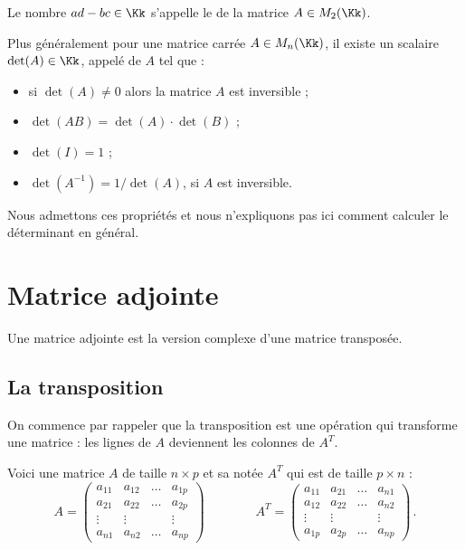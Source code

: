 \documentclass[11pt,class=report,crop=false]{standalone}
\begin{document}
Le nombre $ad-bc \in \Kk$ s'appelle le  de la matrice $A \in M_2(\Kk)$.

Plus généralement pour une matrice carrée $A \in M_n(\Kk)$, il existe
un scalaire $\det(A) \in \Kk$, appelé  de $A$ tel que :
\begin{itemize}
  \item si $\det(A)\neq0$ alors la matrice $A$ est inversible ;
  \item $\det(AB) = \det(A) \cdot \det(B)$ ;
  \item $\det(I) = 1$ ;
  \item $\det(A^{-1}) = 1/\det(A)$, si $A$ est inversible.
\end{itemize}

Nous admettons ces propriétés et nous n'expliquons pas ici comment calculer le déterminant en général.


\section{Matrice adjointe}

Une matrice adjointe est la version complexe d'une matrice transposée.

\subsection{La transposition}

On commence par rappeler que la transposition est une opération qui transforme une matrice : les lignes de $A$ deviennent les colonnes de $A^T$.

Voici une matrice $A$ de taille $n\times p$ et sa  notée $A^T$ qui est de taille $p \times n$ :
$$
A = \left(
\begin{array}{cccc}
a_{11} & a_{12} & \dots & a_{1p}\\
a_{21} & a_{22} & \dots & a_{2p}\\
\vdots & \vdots &&\vdots\\
a_{n1} & a_{n2} & \dots & a_{np}
\end{array}\right)
\qquad\qquad
A^T = \left(
\begin{array}{cccc}
a_{11} & a_{21} & \dots & a_{n1}\\
a_{12} & a_{22} & \dots & a_{n2}\\
\vdots & \vdots &&\vdots\\
a_{1p} & a_{2p} &\dots & a_{np}
\end{array}\right)\, .
$$
\end{document}
